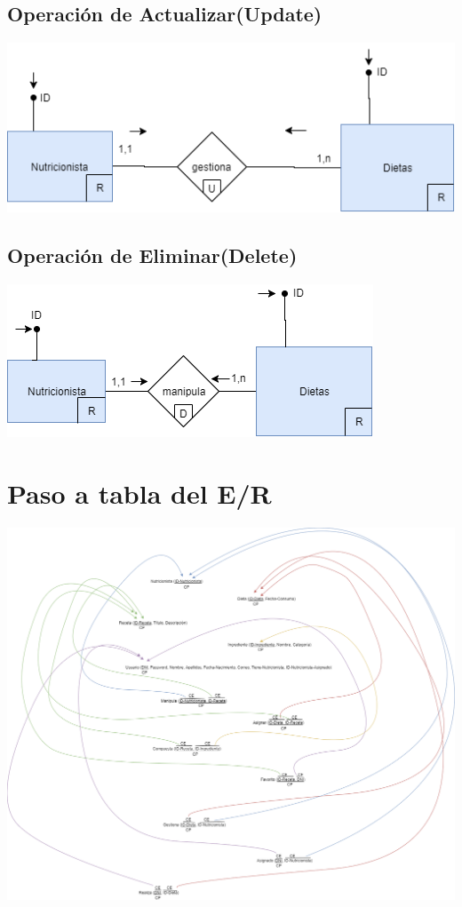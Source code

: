 \documentclass[12pt,letterpaper]{article}
\begin{document}
\subsection{Operación de Actualizar(Update)}
\includegraphics[scale=0.6]{Modificar.png}
\subsection{Operación de Eliminar(Delete)}
\includegraphics[scale=0.6]{Borrar.png}

\section{Paso a tabla del E/R}
\includegraphics[scale=0.35]{Tabla.png}
\newpage
\end{document}
